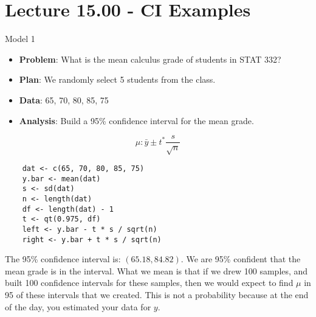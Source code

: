 \section{Lecture 15.00 - CI Examples}
\begin{Example}{Model 1}{}
    \begin{itemize}
        \item \textbf{Problem}: What is the mean calculus grade of students in STAT 332?
        \item \textbf{Plan}: We randomly select 5 students from the class.
        \item \textbf{Data}: 65, 70, 80, 85, 75
        \item \textbf{Analysis}: Build a 95\% confidence interval for the mean grade.
    \end{itemize}
    \[ \mu:\bar{y}\pm t^* \frac{s}{\sqrt{n}} \]
    \begin{verbatim}
    dat <- c(65, 70, 80, 85, 75)
    y.bar <- mean(dat)
    s <- sd(dat)
    n <- length(dat)
    df <- length(dat) - 1
    t <- qt(0.975, df)
    left <- y.bar - t * s / sqrt(n)
    right <- y.bar + t * s / sqrt(n)
    \end{verbatim}
    The 95\% confidence interval is: $(65.18, 84.82)$. We are 95\% confident
    that the mean grade is in the interval. What we mean is that
    if we drew 100 samples, and built 100 confidence intervals for these
    samples, then we would expect to find $\mu$ in 95 of these intervals
    that we created. This is not a probability because at the end of the day,
    you estimated your data for $ y $.
\end{Example}
